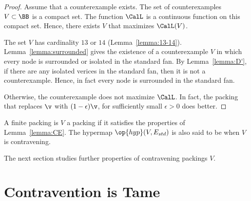 \begin{proof} Assume that a counterexample exists.  The set of
  counterexamples $V\subset\BB$ is a compact set.  The function
  $\CalL$ is a continuous function on this compact set.  Hence, there
  exists $V$ that maximizes $\CalL(V)$.

  The set $V$ has cardinality $13$ or $14$
  (Lemma~\ref{lemma:13-14}). Lemma~\ref{lemma:surrounded} gives the
  existence of a counterexample $V$ in which every node is
  surrounded or isolated in the standard fan.  By
  Lemma~\ref{lemma:D'}, if there are any isolated verices in the
  standard fan, then it is not a counterexample.  Hence, in fact every
  node is surrounded in the standard fan.

    Otherwise, the counterexample does not
  maximize $\CalL$.  In fact, the packing that replaces $\v$ with $(1-\epsilon)\v$,
for sufficiently small $\epsilon>0$ does better.
\end{proof}


\begin{definition}[contravening]
  A finite packing is $V$ a  packing if it
  satisfies the properties of Lemma~\ref{lemma:CE}.  The
 hypermap $\op{hyp}(V,E_{std})$ is also said to be
   when $V$ is contravening.
\end{definition}



The next section studies further properties of contravening packings $V$.



\section{Contravention is Tame}
%
\label{sec:contraproof}

